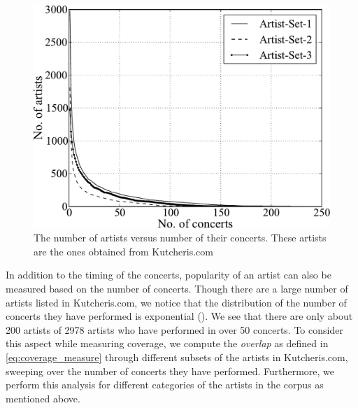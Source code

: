 \begin{figure}
	\begin{center}
		\includegraphics[width=\figSizeSixtyFive]{ch04_datasets/figures/performances-vs-artists.pdf}
	\end{center}
	\caption[Number of artists versus number of concerts]{The number of artists versus number of their concerts. These artists are the ones obtained from Kutcheris.com}
	\label{fig:number_artrist_vs_number_concerts}
\end{figure}

In addition to the timing of the concerts, popularity of an artist can also be measured based on the number of concerts. Though there are a large number of artists listed in Kutcheris.com, we notice that the distribution of the number of concerts they have performed is exponential (). We see that there are only about 200 artists of 2978 artists who have performed in over 50 concerts. To consider this aspect while measuring coverage, we compute the \textit{overlap} as defined in \eqref{eq:coverage_measure} through different subsets of the artists in Kutcheris.com, sweeping over the number of concerts they have performed. Furthermore, we perform this analysis for different categories of the artists in the corpus as mentioned above.

